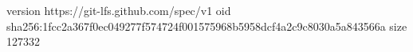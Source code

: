 version https://git-lfs.github.com/spec/v1
oid sha256:1fcc2a367f0ec049277f574724f001575968b5958dcf4a2c9c8030a5a843566a
size 127332

